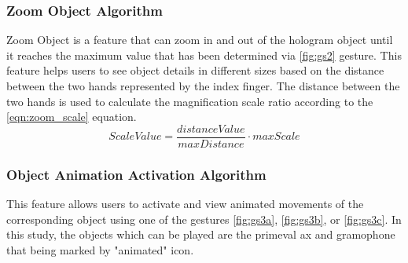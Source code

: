 \documentclass[conference]{IEEEtran}
\begin{document}
	\subsubsection{Zoom Object Algorithm}
		Zoom Object is a feature that can zoom in and out of the hologram object until it reaches the maximum value that has been determined via \ref{fig:gs2} gesture. This feature helps users to see object details in different sizes based on the distance between the two hands represented by the index finger. The distance between the two hands is used to calculate the magnification scale ratio according to the \ref{eqn:zoom_scale} equation.
		\begin{equation}
			ScaleValue = \frac{distanceValue}{maxDistance} \cdot maxScale
			\label{eqn:zoom_scale}
		\end{equation}

	\subsubsection{Object Animation Activation Algorithm}
		This feature allows users to activate and view animated movements of the corresponding object using one of the gestures \ref{fig:gs3a}, \ref{fig:gs3b}, or \ref{fig:gs3c}. In this study, the objects which can be played are the primeval ax and gramophone that being marked by "animated" icon.
\end{document}
